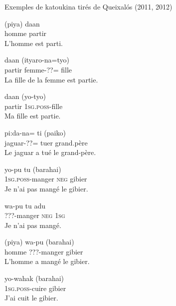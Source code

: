 \documentclass[oldfontcommands,twoside,a4paper,12pt]{article}
\begin{document}
Exemples de katoukina tirés de Queixalós (2011, 2012)

 \begin{exe}
\ex  
\gll  (piya) daan \\
homme partir \\
 \glt   L'homme est parti.
\end{exe}
 
 \begin{exe}
\ex  
\gll  daan (ityaro-na=tyo)  \\
 partir femme-??= fille \\
 \glt   La fille de la femme est partie.
\end{exe}

 \begin{exe}
\ex  
\gll  daan (yo-tyo)  \\
 partir \textsc{1sg.poss}-fille \\
 \glt   Ma fille est partie.
\end{exe}

 \begin{exe}
\ex  
\gll  pi:da-na= ti (paiko)   \\
jaguar-??= tuer grand.père \\
 \glt   Le jaguar a tué le grand-père.
\end{exe}

 \begin{exe}
\ex  
\gll yo-pu tu (barahai) \\
\textsc{1sg.poss}-manger \textsc{neg} gibier \\
 \glt   Je n'ai pas mangé le gibier.
\end{exe}

 \begin{exe}
\ex  
\gll wa-pu tu adu \\
???-manger \textsc{neg} \textsc{1sg} \\
 \glt   Je n'ai pas mangé.
\end{exe}

 \begin{exe}
\ex  
\gll  (piya) wa-pu (barahai) \\
homme ???-manger gibier \\
 \glt   L'homme a mangé le gibier.
\end{exe}

 \begin{exe}
\ex  
\gll  yo-wahak (barahai)  \\
\textsc{1sg.poss}-cuire gibier \\
 \glt   J'ai cuit le gibier.
\end{exe}
\end{document}
